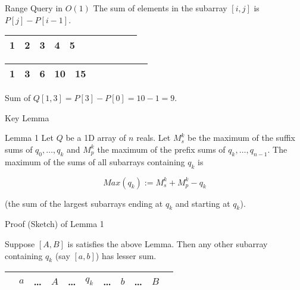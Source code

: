 \documentclass{beamer}
\begin{document}
\begin{frame}{Range Query in $O(1)$}
  The sum of elements in the subarray $[i, j]$ is $P[j] - P[i - 1]$.

  \begin{table}[h]
    \begin{tabular}{|c|c|c|c|c|c|c|c|c|c|c|}
      \hline
      1 & 2 & 3 & 4 & 5 \\
      \hline
    \end{tabular}
  \end{table}
  
  \begin{table}[h]
    \begin{tabular}{|c|c|c|c|c|c|c|c|c|c|c|}
      \hline
      1 & 3 & 6 & 10 & 15 \\
      \hline
    \end{tabular}
  \end{table}

  Sum of $Q[1, 3] = P[3] - P[0] = 10 - 1 = 9$.
\end{frame}

\begin{frame}{Key Lemma}

\begin{alertblock}{Lemma 1}
  Let $Q$ be a 1D array of $n$ reals. Let $M_s^k$ be the maximum of the suffix sums of $q_0, \dots, q_k$ and $M_p^k$ the maximum of the prefix sums of $q_k, \dots, q_{n - 1}$. The maximum of the sums of all subarrays containing $q_k$ is

  $$
  Max(q_k) := M_s^k + M_p^k - q_k
  $$

  (the sum of the largest subarrays ending at $q_k$ and starting at $q_k$).
\end{alertblock}
\end{frame}

\begin{frame}{Proof (Sketch) of Lemma 1}

Suppose $[A, B]$ is satisfies the above Lemma. Then any other subarray containing $q_k$ (say $[a, b]$) has lesser sum.

\begin{table}[h]
  \begin{tabular}{|c|c|c|c|c|c|c|c|c|c|c|}
    \hline
    & $a$ & \dots & $A$ & \dots & $q_k$ & \dots & $b$ & \dots & $B$ &  \\
    \hline
  \end{tabular}
\end{table}

\end{frame}
\end{document}
